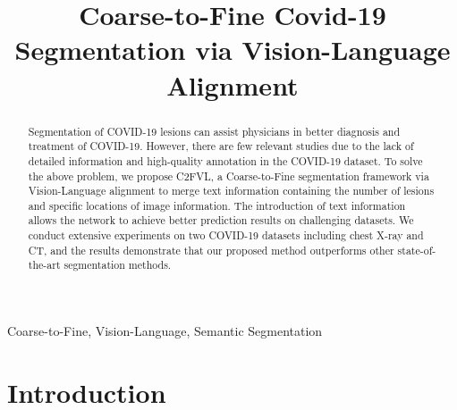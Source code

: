 \documentclass{article}
\title{Coarse-to-Fine Covid-19 Segmentation via Vision-Language Alignment}
\begin{document}
\topmargin=0mm
\maketitle
\begin{abstract}
Segmentation of COVID-19 lesions can assist physicians in better diagnosis and treatment of COVID-19. However, there are few relevant studies due to the lack of detailed information and high-quality annotation in the COVID-19 dataset. To solve the above problem, we propose C2FVL, a Coarse-to-Fine segmentation framework via Vision-Language alignment to merge text information containing the number of lesions and specific locations of image information. The introduction of text information allows the network to achieve better prediction results on challenging datasets. We conduct extensive experiments on two COVID-19 datasets including chest X-ray and CT, and the results demonstrate that our proposed method outperforms other state-of-the-art segmentation methods.
\end{abstract}
\begin{keywords}
Coarse-to-Fine, Vision-Language, Semantic Segmentation
\end{keywords}
\section{Introduction}
\label{sec:intro}
\end{document}

